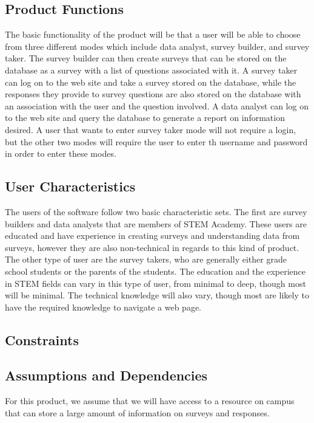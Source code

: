 \documentclass[letterpaper,10pt,titlepage, draftclsnofoot,onecolumn]{IEEEtran}
\begin{document}
\subsection{Product Functions}
The basic functionality of the product will be that a user will be able to choose from three different modes which include data analyst, survey builder, and survey taker. 
The survey builder can then create surveys that can be stored on the database as a survey with a list of questions associated with it.
A survey taker can log on to the web site and take a survey stored on the database, while the responses they provide to survey questions are also stored on the database with an association with the user and the question involved.
A data analyst can log on to the web site and query the database to generate a report on information desired.
A user that wants to enter survey taker mode will not require a login, but the other two modes will require the user to enter th username and password in order to enter these modes. 

\subsection{User Characteristics}
The users of the software follow two basic characteristic sets. The first are survey builders and data analysts that are members of
STEM Academy. These users are educated and have experience in creating surveys and understanding data from surveys,
however they are also non-technical in regards to this kind of product. The other type of user are the survey takers, who are
generally either grade school students or the parents of the students. The education and the experience in STEM fields
can vary in this type of user, from minimal to deep, though most will be minimal. The technical knowledge will also vary, though
most are likely to have the required knowledge to navigate a web page.
\subsection{Constraints}
\subsection{Assumptions and Dependencies}
For this product, we assume that we will have access to a resource on campus that can store a large amount of information on
surveys and responses. %
\end{document}
